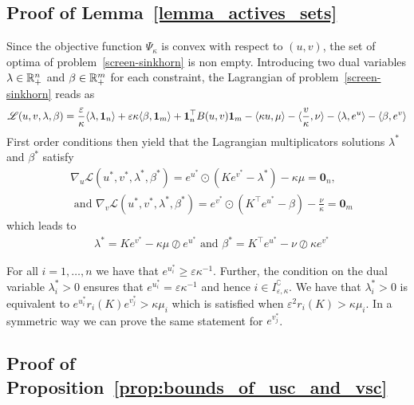 
\subsection{Proof of Lemma~\ref{lemma_actives_sets}}

Since the objective function $\Psi_{\kappa}$ is convex with respect to $(u,v)$, the set of optima of problem~\eqref{screen-sinkhorn} is non empty.
Introducing two dual variables $\lambda \in {\mathbb{R}}^n_{+}$ and $\beta \in {\mathbb{R}}^m_{+}$ for each constraint, the Lagrangian of problem~\eqref{screen-sinkhorn} reads as 
\begin{equation*}
  \mathscr{L}(u,v, \lambda, \beta) = \frac \varepsilon\kappa\langle \lambda, \mathbf{1}_n \rangle + \varepsilon\kappa\langle \beta, \mathbf{1}_m \rangle + \mathbf{1}_n^\top B(u,v) \mathbf{1}_m - \langle \kappa u, \mu \rangle - \langle \frac v\kappa, \nu \rangle -\langle \lambda,e^{u} \rangle - \langle \beta,e^{v} \rangle
\end{equation*}
First order conditions then yield that the Lagrangian multiplicators solutions $\lambda^{*}$ and $\beta^{*}$ satisfy 
\begin{align*}
  &\nabla_u\mathscr{L}(u^{*},v^{*}, \lambda^{*}, \beta^{*})=  e^{u^{*}} \odot(Ke^{v^{*}} - \lambda^{*}) - \kappa\mu = \mathbf 0_n,\\
  & \text{ and } \nabla_v\mathscr{L}(u^{*},v^{*}, \lambda^{*}, \beta^{*})=  e^{v^{*}} \odot(K^\top e^{u^{*}} - \beta) - \frac \nu\kappa = \mathbf 0_m
\end{align*}
which leads to 
\begin{align*}
  &\lambda^{*} = K e^{v^{*}} - \kappa\mu \oslash e^{u^{*}} \text{ and }
  \beta^{*} = K^\top e^{u^{*}} - \nu \oslash \kappa e^{v^{*}}
\end{align*}

For all $i=1, \ldots, n$ we have that $e^{u^{*}_i} \geq \varepsilon\kappa^{-1}$. Further, the condition on the dual variable $\lambda^{*}_i > 0$  ensures that $e^{u^{*}_i} = \varepsilon\kappa^{-1}$ and hence $i \in I^\complement_{\varepsilon,\kappa}$. We have that $\lambda^{*}_i > 0$ is equivalent to $e^{u^{*}_i}r_i(K) e^{v^{*}_j} >  \kappa{\mu_i}$ which  is satisfied when $\varepsilon^2r_i(K) >  \kappa{\mu_i}.$  
In a symmetric way we can prove the same statement for $e^{v^{*}_j}$.

\subsection{Proof of Proposition~\ref{prop:bounds_of_usc_and_vsc}}

